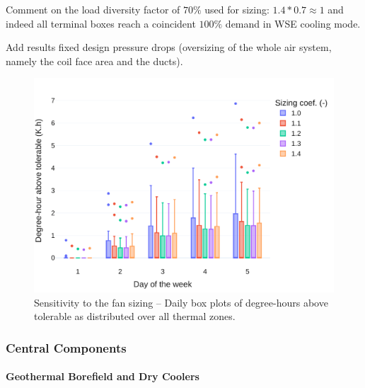 Comment on the load diversity factor of $70\%$ used for sizing:
$1.4 * 0.7 \approx 1$ and indeed all terminal boxes reach a coincident $100\%$ demand in WSE cooling mode.

Add results fixed design pressure drops (oversizing of the whole air system, namely the coil face area and the ducts).


\begin{figure}[!htbp]
\centering
\includegraphics[width=.7\linewidth]{../python_scripts/figures/FanSizing.pdf}
\caption{Sensitivity to the fan sizing -- Daily box plots of degree-hours above tolerable as distributed over all thermal zones.}
\label{fig:fan}
\end{figure}


\subsubsection{Central Components} \label{sec:dhc}

\paragraph{Geothermal Borefield and Dry Coolers}

